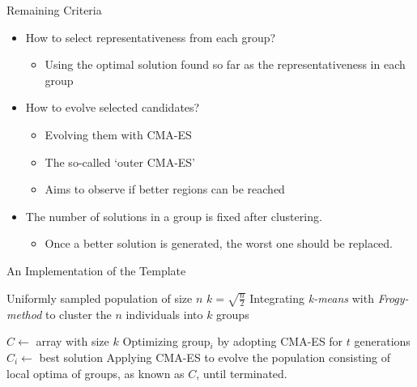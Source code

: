 \begin{frame}{Remaining Criteria}
  \begin{itemize}
    \item How to select representativeness from each group?
      \begin{itemize}
        \item Using the optimal solution found so far as the representativeness in
          each group
      \end{itemize}
      \vspace*{14pt}
    \item How to evolve selected candidates?
      \begin{itemize}
        \item Evolving them with CMA-ES
        \item The so-called `outer CMA-ES'
        \item Aims to observe if better regions can be reached
      \end{itemize}
      \vspace*{14pt}
    \item The number of solutions in a group is fixed after clustering.
      \begin{itemize}
        \item Once a better solution is generated, the worst one should
          be replaced.
      \end{itemize}
  \end{itemize}
\end{frame}

\begin{frame}{An Implementation of the Template}
  \scalebox{0.8}
  {
    \begin{algorithm}[H]{
        Uniformly sampled population of size $n$\;
        $k = \sqrt{\frac{n}{2}}$\;
        Integrating \emph{k-means} with \emph{Frogy-method} to cluster the
        $n$ individuals into $k$ groups\;

        $C\leftarrow$ array with size $k$\;
        {
          Optimizing group$_i$ by adopting CMA-ES for $t$ generations\;
          $C_i\leftarrow$ best solution\;
          Applying CMA-ES to evolve the population consisting of local
          optima of groups, as known as $C$, until terminated.\;
        }
      }
    \end{algorithm} 
  }
\end{frame}

